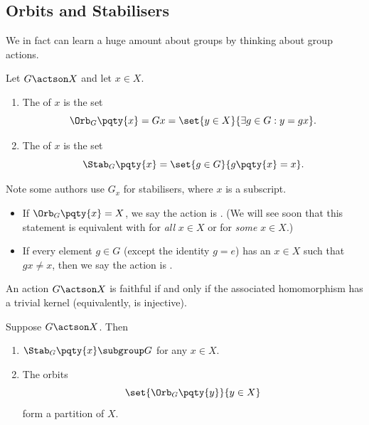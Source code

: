 \subsection{Orbits and Stabilisers}
\label{sec:orbits-and-stabilisers}

We in fact can learn a huge amount about groups by thinking about group actions.

\begin{definition}
    \label{def:orbit-stabiliser}%
    Let \(G \actson X\) and let \(x \in X\).
    \begin{enumerate}
        \item The  of \(x\) is the set
        \[
            \Orb_{G}\pqty{x} = Gx = \set{y \in X}{\exists g \in G: y = gx}.
        \]
        \item The  of \(x\) is the set
        \[
            \Stab_{G}\pqty{x} = \set{g \in G}{g\pqty{x} = x}.
        \]
    \end{enumerate}

    Note some authors use \(G_x\) for stabilisers, where \(x\) is a subscript.

    \begin{itemize}
        \item If \(\Orb_{G}\pqty{x} = X\), we say the action is . (We will see soon that this statement is equivalent with for \emph{all} \(x \in X\) or for \emph{some} \(x \in X\).)
        \item If every element \(g \in G\) (except the identity \(g = e\)) has an \(x \in X\) such that \(gx \neq x\), then we say the action is .
    \end{itemize}
\end{definition}

\begin{remark}
    An action \(G \actson X\) is faithful if and only if the associated homomorphism has a trivial kernel (equivalently, is injective).
\end{remark}

\begin{proposition}
    \label{prop:stabilisers-subgroups-orbits-partition}%
    Suppose \(G \actson X\). Then
    \begin{enumerate}
        \item \(\Stab_{G} \pqty{x} \subgroup G\) for any \(x \in X\).
        \item The orbits
        \[
            \set{\Orb_{G}\pqty{y}}{y \in X}
        \]
        form a partition of \(X\).
    \end{enumerate}
\end{proposition}

